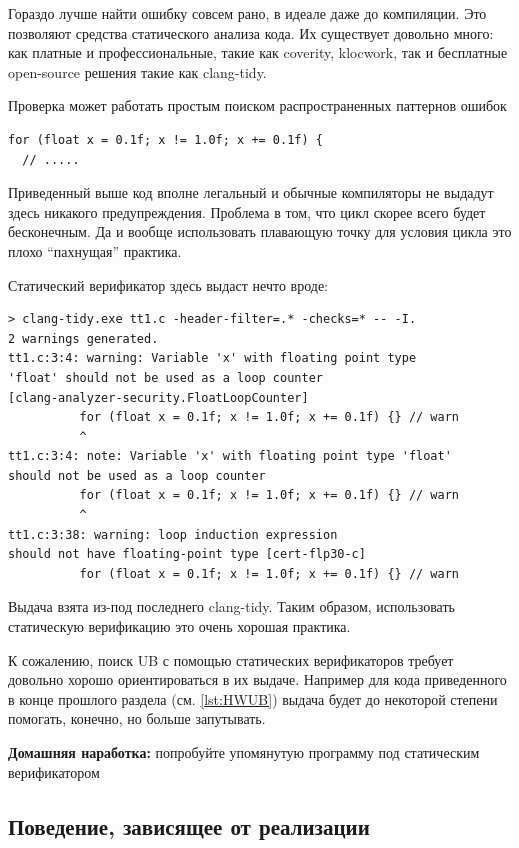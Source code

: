 \documentclass[a4paper,12pt,oneside]{article}
\begin{document}
Гораздо лучше найти ошибку совсем рано, в идеале даже до компиляции. Это позволяют средства статического анализа кода. Их существует довольно много: как платные и профессиональные, такие как coverity, klocwork, так и бесплатные open-source решения такие как clang-tidy.

Проверка может работать простым поиском распространенных паттернов ошибок

\begin{lstlisting}
for (float x = 0.1f; x != 1.0f; x += 0.1f) {
  // .....
\end{lstlisting}

Приведенный выше код вполне легальный и обычные компиляторы не выдадут здесь никакого предупреждения. Проблема в том, что цикл скорее всего будет бесконечным. Да и вообще использовать плавающую точку для условия цикла это плохо ``пахнущая'' практика.

Статический верификатор здесь выдаст нечто вроде:

\begin{verbatim}
> clang-tidy.exe tt1.c -header-filter=.* -checks=* -- -I.
2 warnings generated.
tt1.c:3:4: warning: Variable 'x' with floating point type 
'float' should not be used as a loop counter 
[clang-analyzer-security.FloatLoopCounter]
          for (float x = 0.1f; x != 1.0f; x += 0.1f) {} // warn
          ^
tt1.c:3:4: note: Variable 'x' with floating point type 'float' 
should not be used as a loop counter
          for (float x = 0.1f; x != 1.0f; x += 0.1f) {} // warn
          ^
tt1.c:3:38: warning: loop induction expression 
should not have floating-point type [cert-flp30-c]
          for (float x = 0.1f; x != 1.0f; x += 0.1f) {} // warn
\end{verbatim}

Выдача взята из-под последнего clang-tidy. Таким образом, использовать статическую верификацию это очень хорошая практика.

К сожалению, поиск UB с помощью статических верификаторов требует довольно хорошо ориентироваться в их выдаче. Например для кода приведенного в конце прошлого раздела (см. \ref{lst:HWUB}) выдача будет до некоторой степени помогать, конечно, но больше запутывать.

\textbf{Домашняя наработка:} попробуйте упомянутую программу под статическим верификатором

\subsection{Поведение, зависящее от реализации}\label{ImplementationDefined}
\end{document}
